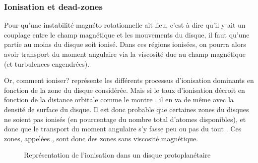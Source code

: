 
\subsubsection{Ionisation et dead-zones}
Pour qu'une instabilité magnéto rotationnelle ait lieu, c'est à dire qu'il y ait un couplage entre le champ magnétique et les mouvements du disque, il faut qu'une partie au moins du disque soit ionisé. Dans ces régions ionisées, on pourra alors avoir transport du moment angulaire via la viscosité due au champ magnétique (et turbulences engendrées). 

Or, comment ioniser?  représente les différents processus d'ionisation dominants en fonction de la zone du disque considérée. Mais si le taux d'ionisation décroit en fonction de la distance orbitale \citep{ilgner2006ionisation1} comme le montre , il en va de même avec la densité de surface du disque. Il est donc probable que certaines zones du disques ne soient pas ionisés (en pourcentage du nombre total d'atomes disponibles), et donc que le transport du moment angulaire s'y fasse peu ou pas du tout \citep{gammie1996layered}. Ces zones, appelées , sont donc des zones sans viscosité magnétique. 

\begin{figure}[htb]
\centering
{}\hfill
{}
\caption{Représentation de l'ionisation dans un disque protoplanétaire}
\end{figure}


